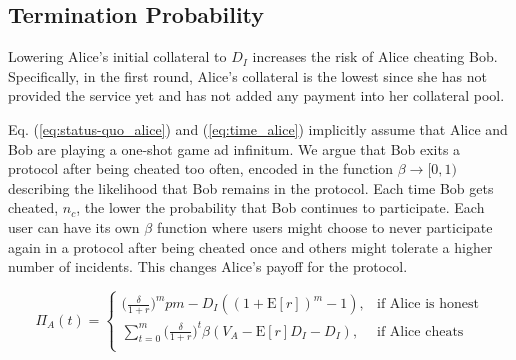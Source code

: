 \documentclass[runningheads]{llncs}
\newcommand{\dom}[1]{\todo[linecolor=green,backgroundcolor=green!25,bordercolor=green,inline,caption={}]{Comment by Dominik: #1}}
\begin{document}
\subsection{Termination Probability}
Lowering Alice's initial collateral to $D_I$ increases the risk of Alice cheating Bob.
Specifically, in the first round, Alice's collateral is the lowest since she has not provided the service yet and has not added any payment into her collateral pool.

Eq. (\ref{eq:status-quo_alice}) and (\ref{eq:time_alice}) implicitly assume that Alice and Bob are playing a one-shot game ad infinitum.
We argue that Bob exits a protocol after being cheated too often, encoded in the function $\beta \to [0,1)$ describing the likelihood that Bob remains in the protocol.
Each time Bob gets cheated, $n_c$, the lower the probability that Bob continues to participate.
Each user can have its own $\beta$ function where users might choose to never participate again in a protocol after being cheated once and others might tolerate a higher number of incidents.
This changes Alice's payoff for the protocol.

\begin{equation}
\label{eq:promise_alice}
\Pi_A(t) = 
\begin{cases}
    \big( \frac{\delta}{1+r} \big)^{m} pm - D_{I}((1+\mathrm{E}[r])^{m}-1), & \text{if Alice is honest} \\
    \sum_{t=0}^{m} \big( \frac{\delta}{1+r} \big)^{t} \beta (V_A - \mathrm{E}[r]D_{I}-D_{I}), & \text{if Alice cheats} \\
\end{cases}
\end{equation}

\end{document}
